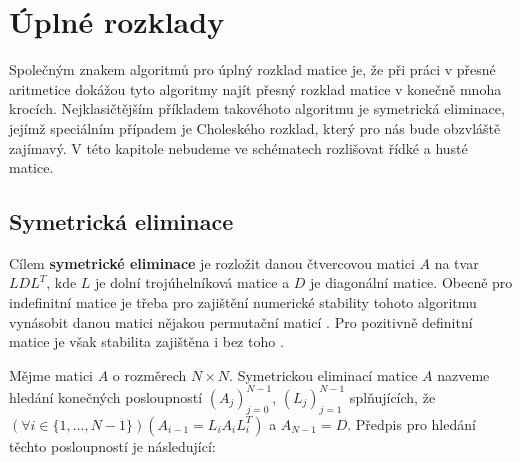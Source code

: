 \documentclass{ctuthesis}
\theoremstyle{plain}
\theoremstyle{definition}
\begin{document}
\section{Úplné rozklady}

Společným znakem algoritmů pro úplný rozklad matice je, že při práci v přesné aritmetice dokážou tyto algoritmy najít přesný rozklad matice v konečně mnoha krocích. Nejklasičtějším příkladem takovéhoto algoritmu je symetrická eliminace, jejímž speciálním případem je Choleského rozklad, který pro nás bude obzvláště zajímavý. V této kapitole nebudeme ve schématech rozlišovat řídké a husté matice.

\subsection{Symetrická eliminace}

Cílem \textbf{symetrické eliminace} je rozložit danou čtvercovou matici $A$ na tvar $LDL^T$, kde $L$ je dolní trojúhelníková matice a $D$ je diagonální matice. Obecně pro indefinitní matice je třeba pro zajištění numerické stability tohoto algoritmu vynásobit danou matici nějakou permutační maticí \cite{fomo:67}. Pro pozitivně definitní matice je však stabilita zajištěna i bez toho \cite{wil:68}.

Mějme matici $A$ o rozměrech $N \times N$. Symetrickou eliminací matice $A$ nazveme hledání konečných posloupností $(A_j)_{j=0}^{N-1}$, $(L_j)_{j=1}^{N-1}$ splňujících, že $\left(\forall i \in \{1,...,N-1\}\right)\left(A_{i-1}=L_i A_i L_i^T \right)$ a $A_{N-1}=D$.
Předpis pro hledání těchto posloupností je následující:
\end{document}
